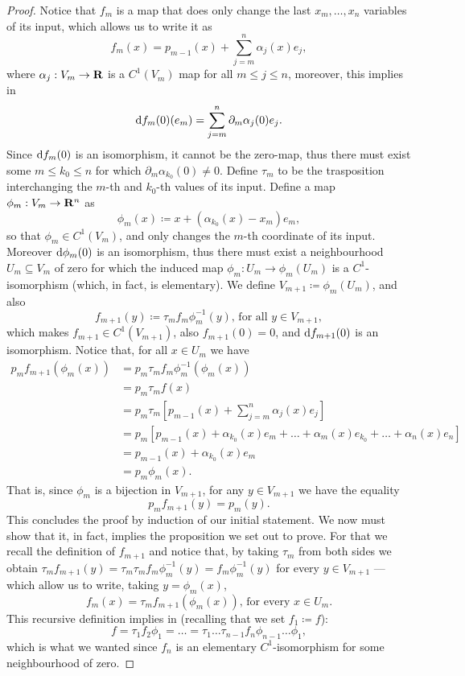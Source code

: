 \begin{proof}
Notice that \(f_m\) is a map that does only change the last \(x_m, \dots,
x_{n}\) variables of its input, which allows us to write it as
\[
  f_{m}(x) = p_{m-1}(x) + \sum_{j=m}^n \alpha_j(x) e_j,
\]
where \(\alpha_j: V_m \to \mathbf{R}\) is a \(C^1(V_m)\) map for all \(m \leq j \leq
n\), moreover, this implies in
\[
  \mathrm{d} f_m(0)(e_m) = \sum_{j = m}^n \partial_{m} \alpha_j(0) e_{j}.
\]
Since \(\mathrm{d} f_{m}(0)\) is an isomorphism, it cannot be the zero-map, thus
there must exist some \(m \leq k_0 \leq n\) for which \(\partial_m
\alpha_{k_0}(0) \neq 0\). Define \(\tau_m\) to be the trasposition interchanging
the \(m\)-th and \(k_0\)-th values of its input. Define a map \(\phi_m: V_m \to
\mathbf{R}^n\) as
\[
  \phi_m(x) \coloneq x + (\alpha_{k_0}(x) - x_m) e_m,
\]
so that \(\phi_{m} \in C^1(V_m)\), and only changes the \(m\)-th coordinate of
its input. Moreover \(\mathrm{d} \phi_m(0)\) is an isomorphism, thus there must
exist a neighbourhood \(U_m \subseteq V_m\) of zero for which the induced map
\(\phi_m: U_m \to \phi_m(U_m)\) is a \(C^1\)-isomorphism (which, in fact, is
elementary). We define \(V_{m + 1} \coloneq \phi_m(U_m)\), and also
\[
  f_{m+1}(y) \coloneq \tau_m f_m\phi^{-1}_m(y)\text{, for all } y \in V_{m+1},
\]
which makes \(f_{m+1} \in C^{1}(V_{m+1})\), also \(f_{m+1}(0) = 0\), and \(\mathrm{d}
f_{m+1}(0)\) is an isomorphism. Notice that, for all \(x \in U_m\) we have
\begin{align*}
  p_m f_{m+1}(\phi_m(x))
  &= p_m \tau_m f_m \phi_m^{-1}(\phi_m(x)) \\
  &= p_m \tau_m f(x) \\
  &= p_m \tau_m \left[ p_{m-1}(x) + \sum_{j=m}^n \alpha_j(x) e_j \right] \\
  &= p_{m} \left[
    p_{m-1}(x) + \alpha_{k_0}(x) e_m + \dots
    + \alpha_m(x) e_{k_0} + \dots + \alpha_n(x) e_n
    \right] \\
  &= p_{m-1}(x) + \alpha_{k_0}(x) e_m \\
  &= p_m \phi_m(x).
\end{align*}
That is, since \(\phi_m\) is a bijection in \(V_{m+1}\), for any \(y \in
V_{m+1}\) we have the equality
\[
  p_m f_{m+1}(y) = p_m(y).
\]
This concludes the proof by induction of our initial statement. We now must show
that it, in fact, implies the proposition we set out to prove. For that we
recall the definition of \(f_{m+1}\) and notice that, by taking \(\tau_m\) from
both sides we obtain \(\tau_m f_{m+1}(y) = \tau_{m} \tau_m f_m \phi_m^{-1}(y) =
f_m \phi_m^{-1}(y)\) for every \(y \in V_{m+1}\) --- which allow us to write,
taking \(y = \phi_m(x)\),
\[
  f_m(x) = \tau_m f_{m+1}(\phi_m(x)) \text{, for every } x \in U_m.
\]
This recursive definition implies in (recalling that we set \(f_1 \coloneq f\)):
\[
  f = \tau_1 f_2 \phi_1
  = \dots
  = \tau_1 \dots \tau_{n-1} f_n \phi_{n-1} \dots \phi_{1},
\]
which is what we wanted since \(f_n\) is an elementary \(C^{1}\)-isomorphism for
some neighbourhood of zero.
\end{proof}

